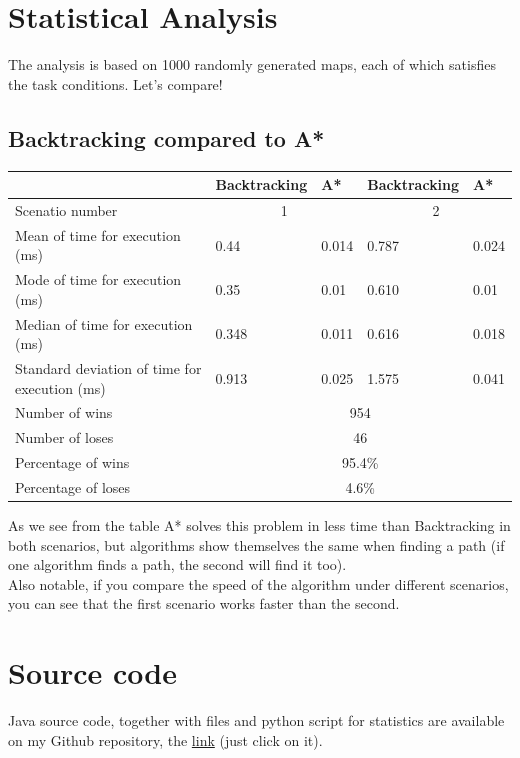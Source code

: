 \documentclass[a4paper]{article}
\begin{document}
\section{Statistical Analysis}
The analysis is based on 1000 randomly generated maps, each of which satisfies the task conditions. Let's compare!
\subsection*{Backtracking compared to A*} 

\begin{center}
\begin{tabular}{ |p{5cm}|p{2cm}|p{2cm}|p{2cm}|p{2cm}| }
    \hline
    & Backtracking&A*&Backtracking&A*\\
    \hline
    Scenatio number&\multicolumn{2}{|c|}{1} & \multicolumn{2}{|c|}{2}\\
    \hline
    Mean of time for execution (ms)& 0.44 & 0.014 &0.787& 0.024\\
    Mode of time for execution (ms) & 0.35  & 0.01&0.610& 0.01\\
    Median of time for execution (ms)& 0.348 & 0.011&0.616& 0.018\\
    Standard deviation of time for execution (ms) & 0.913 & 0.025&1.575& 0.041\\
    \hline
    Number of wins & \multicolumn{4}{|c|}{954} \\
    Number of loses & \multicolumn{4}{|c|}{46}  \\
    Percentage of wins & \multicolumn{4}{|c|}{95.4\%} \\
    Percentage of loses & \multicolumn{4}{|c|}{4.6\%} \\
    \hline
\end{tabular}
\end{center}
As we see from the table A* solves this problem in less time than Backtracking in both scenarios, but algorithms show themselves the same when finding a path (if one algorithm finds a path, the second will find it too).\\
Also notable, if you compare the speed of the algorithm under different scenarios, you can see that the first scenario works faster than the second.

\section{Source code}
Java source code, together with files and python script for statistics are available on my Github repository, the \href{https://github.com/NAD777/AI-assignment-1}{link} (just click on it).
\end{document}
